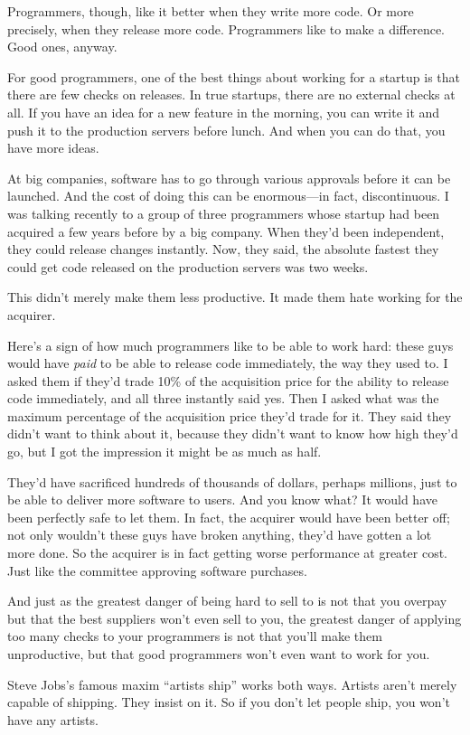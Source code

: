 Programmers, though, like it better when they write more code. Or more
precisely, when they release more code. Programmers like to make a
difference. Good ones, anyway.

For good programmers, one of the best things about working for a startup
is that there are few checks on releases. In true startups, there are no
external checks at all. If you have an idea for a new feature in the
morning, you can write it and push it to the production servers before
lunch. And when you can do that, you have more ideas.

At big companies, software has to go through various approvals before it
can be launched. And the cost of doing this can be enormous---in fact,
discontinuous. I was talking recently to a group of three programmers
whose startup had been acquired a few years before by a big company.
When they'd been independent, they could release changes instantly. Now,
they said, the absolute fastest they could get code released on the
production servers was two weeks.

This didn't merely make them less productive. It made them hate working
for the acquirer.

Here's a sign of how much programmers like to be able to work hard:
these guys would have \emph{paid} to be able to release code
immediately, the way they used to. I asked them if they'd trade 10\% of
the acquisition price for the ability to release code immediately, and
all three instantly said yes. Then I asked what was the maximum
percentage of the acquisition price they'd trade for it. They said they
didn't want to think about it, because they didn't want to know how high
they'd go, but I got the impression it might be as much as half.

They'd have sacrificed hundreds of thousands of dollars, perhaps
millions, just to be able to deliver more software to users. And you
know what? It would have been perfectly safe to let them. In fact, the
acquirer would have been better off; not only wouldn't these guys have
broken anything, they'd have gotten a lot more done. So the acquirer is
in fact getting worse performance at greater cost. Just like the
committee approving software purchases.

And just as the greatest danger of being hard to sell to is not that you
overpay but that the best suppliers won't even sell to you, the greatest
danger of applying too many checks to your programmers is not that
you'll make them unproductive, but that good programmers won't even want
to work for you.

Steve Jobs's famous maxim ``artists ship'' works both ways. Artists
aren't merely capable of shipping. They insist on it. So if you don't
let people ship, you won't have any artists.
